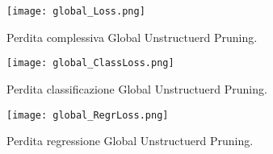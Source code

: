 \begin{figure}
    \centering
    \texttt{[image: global\_Loss.png]}
    \centering
    \caption{Perdita complessiva Global Unstructuerd Pruning.}
    \label{glob_loss_global_pruning}
\end{figure}
\begin{figure}
    \centering
    \texttt{[image: global\_ClassLoss.png]}
    \centering
    \caption{Perdita classificazione Global Unstructuerd Pruning.}
    \label{glob_loss_class_pruning}
\end{figure}
\begin{figure}
    \centering
    \texttt{[image: global\_RegrLoss.png]}
    \centering
    \caption{Perdita regressione Global Unstructuerd Pruning.}
    \label{glob_loss_regr_pruning}
\end{figure}

